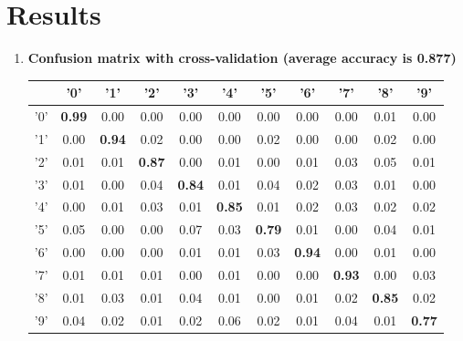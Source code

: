 \documentclass[12pt]{article}
\begin{document}
\section*{Results}
\vspace{-20pt}
\noindent\makebox[\linewidth]{\rule{\textwidth}{0.4pt}}

\begin{enumerate}
	\item {\bf Confusion matrix with cross-validation (average accuracy is 0.877)}
	\begin{center}
	\begin{tabular}{|c|c|c|c|c|c|c|c|c|c|c|}
		\hline
		\diaghead{\theadfont Diag ColumnmnHead II}{truth}{result} 
		& '0' & '1' & '2' & '3' & '4' & '5' & '6' & '7' & '8' & '9' \\
		\hline
		'0' & {\bf 0.99} & 0.00 & 0.00 & 0.00 & 0.00 & 0.00 & 0.00 & 0.00 & 0.01 & 0.00 \\ 
		\hline
		'1' & 0.00 & {\bf 0.94} & 0.02 & 0.00 & 0.00 & 0.02 & 0.00 & 0.00 & 0.02 & 0.00 \\ 
		\hline
		'2' & 0.01 & 0.01 & {\bf 0.87} & 0.00 & 0.01 & 0.00 & 0.01 & 0.03 & 0.05 & 0.01 \\ 
		\hline
		'3' & 0.01 & 0.00 & 0.04 & {\bf 0.84} & 0.01 & 0.04 & 0.02 & 0.03 & 0.01 & 0.00 \\ 
		\hline
		'4' & 0.00 & 0.01 & 0.03 & 0.01 & {\bf 0.85} & 0.01 & 0.02 & 0.03 & 0.02 & 0.02 \\ 
		\hline
		'5' & 0.05 & 0.00 & 0.00 & 0.07 & 0.03 & {\bf 0.79} & 0.01 & 0.00 & 0.04 & 0.01 \\ 
		\hline
		'6' & 0.00 & 0.00 & 0.00 & 0.01 & 0.01 & 0.03 & {\bf 0.94} & 0.00 & 0.01 & 0.00 \\ 
		\hline
		'7' & 0.01 & 0.01 & 0.01 & 0.00 & 0.01 & 0.00 & 0.00 & {\bf 0.93} & 0.00 & 0.03 \\ 
		\hline
		'8' & 0.01 & 0.03 & 0.01 & 0.04 & 0.01 & 0.00 & 0.01 & 0.02 & {\bf 0.85} & 0.02 \\ 
		\hline
		'9' & 0.04 & 0.02 & 0.01 & 0.02 & 0.06 & 0.02 & 0.01 & 0.04 & 0.01 & {\bf 0.77} \\ 
		\hline
	\end{tabular}
	\end{center}
	

\end{enumerate}
\end{document}
